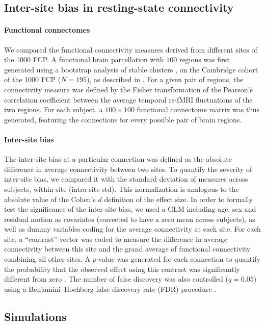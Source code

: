\documentclass[authoryear]{elsarticle}
\begin{document}
\subsection{Inter-site bias in resting-state connectivity}
\paragraph{Functional connectomes} We compared the functional connectivity measures derived from different sites of the 1000 FCP. A functional brain parcellation with $100$ regions was first generated using a bootstrap analysis of stable clusters \citep{Bellec2010c}, on the Cambridge cohort of the 1000 FCP ($N=195$), as described in \cite{Orban2015}. For a given pair of regions, the connectivity measure was defined by the Fisher transformation of the Pearson's correlation coefficient between the average temporal rs-fMRI fluctuations of the two regions. For each subject, a $100 \times 100$ functional connectome matrix was thus generated, featuring the connections for every possible pair of brain regions. 

\paragraph{Inter-site bias} The inter-site bias at a particular connection was defined as the absolute difference in average connectivity between two sites. To quantify the severity of inter-site bias, we compared it with the standard deviation of measures across subjects, within site (intra-site std). This normalization is analogous to the absolute value of the Cohen's $d$ definition of the effect size. In order to formally test the significance of the inter-site bias, we used a GLM including age, sex and residual motion as covariates (corrected to have a zero mean across subjects), as well as dummy variables coding for the average connectivity at each site. For each site, a ``contrast'' vector was coded to measure the difference in average connectivity between this site and the grand average of functional connectivity combining all other sites. A $p$-value was generated for each connection to quantify the probability that the observed effect using this contrast was significantly different from zero \citep{Worsley1995}. The number of false discovery was also controlled ($q=0.05$) using a Benjamini–Hochberg false discovery rate (FDR) procedure \citep{Benjamini1995}.


\subsection{Simulations}
\end{document}
